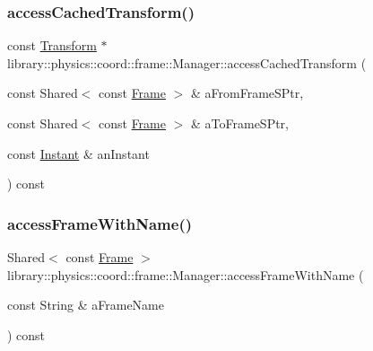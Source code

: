 \subsubsection{\texorpdfstring{access\+Cached\+Transform()}{accessCachedTransform()}}
{\footnotesize\ttfamily const \hyperlink{classlibrary_1_1physics_1_1coord_1_1_transform}{Transform} $\ast$ library\+::physics\+::coord\+::frame\+::\+Manager\+::access\+Cached\+Transform (\begin{DoxyParamCaption}\item[{const Shared$<$ const \hyperlink{classlibrary_1_1physics_1_1coord_1_1_frame}{Frame} $>$ \&}]{a\+From\+Frame\+S\+Ptr,  }\item[{const Shared$<$ const \hyperlink{classlibrary_1_1physics_1_1coord_1_1_frame}{Frame} $>$ \&}]{a\+To\+Frame\+S\+Ptr,  }\item[{const \hyperlink{classlibrary_1_1physics_1_1time_1_1_instant}{Instant} \&}]{an\+Instant }\end{DoxyParamCaption}) const}

\mbox{\label{classlibrary_1_1physics_1_1coord_1_1frame_1_1_manager_a13b4885965a111cebff6f04339d81596}} 
\subsubsection{\texorpdfstring{access\+Frame\+With\+Name()}{accessFrameWithName()}}
{\footnotesize\ttfamily Shared$<$ const \hyperlink{classlibrary_1_1physics_1_1coord_1_1_frame}{Frame} $>$ library\+::physics\+::coord\+::frame\+::\+Manager\+::access\+Frame\+With\+Name (\begin{DoxyParamCaption}\item[{const String \&}]{a\+Frame\+Name }\end{DoxyParamCaption}) const}

\mbox{\label{classlibrary_1_1physics_1_1coord_1_1frame_1_1_manager_a4c1070c91adb2bccc92c685d3f7bfc0b}} 
